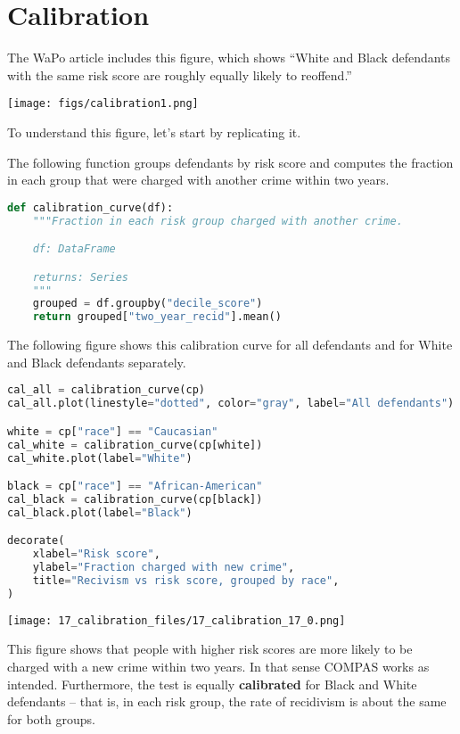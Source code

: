 \section{Calibration}\label{calibration}

The WaPo article includes this figure, which shows ``White and Black
defendants with the same risk score are roughly equally likely to
reoffend.''

\texttt{[image: figs/calibration1.png]}

To understand this figure, let's start by replicating it.

The following function groups defendants by risk score and computes the
fraction in each group that were charged with another crime within two
years.

\begin{lstlisting}[language=Python,style=source]
def calibration_curve(df):
    """Fraction in each risk group charged with another crime.

    df: DataFrame

    returns: Series
    """
    grouped = df.groupby("decile_score")
    return grouped["two_year_recid"].mean()
\end{lstlisting}

\pagebreak

The following figure shows this calibration curve for all defendants and
for White and Black defendants separately.

\begin{lstlisting}[language=Python,style=source]
cal_all = calibration_curve(cp)
cal_all.plot(linestyle="dotted", color="gray", label="All defendants")

white = cp["race"] == "Caucasian"
cal_white = calibration_curve(cp[white])
cal_white.plot(label="White")

black = cp["race"] == "African-American"
cal_black = calibration_curve(cp[black])
cal_black.plot(label="Black")

decorate(
    xlabel="Risk score",
    ylabel="Fraction charged with new crime",
    title="Recivism vs risk score, grouped by race",
)
\end{lstlisting}

\begin{center}
\texttt{[image: 17\_calibration\_files/17\_calibration\_17\_0.png]}
\end{center}

This figure shows that people with higher risk scores are more likely to
be charged with a new crime within two years. In that sense COMPAS works
as intended. Furthermore, the test is equally \textbf{calibrated} for
Black and White defendants -- that is, in each risk group, the rate of
recidivism is about the same for both groups.

